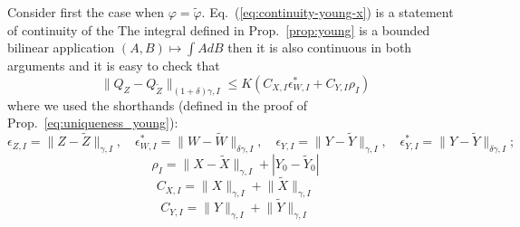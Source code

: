 \documentclass[a4paper,12pt,reqno]{amsproc}
\newcommand{\norm}[1]{\lVert #1\rVert}
\newcommand{\wt}{\widetilde}
\begin{document}
\proof
Consider first the case when $\varphi =\wt \varphi$.
Eq.~(\ref{eq:continuity-young-x}) is a statement of continuity of the
The integral defined in Prop.~\ref{prop:young} is  a bounded bilinear
application $(A,B) \mapsto \int A dB$ then it is also continuous in
both arguments and it is easy to check that  
\begin{equation}
\label{eq:continuity-young-x}
  \norm{Q_Z-Q_{\wt Z}}_{(1+\delta)\gamma,I} \le K(C_{X,I}
  \epsilon^*_{W,I} + C_{Y,I} \rho_I)
\end{equation}
where we used the shorthands (defined in the proof of Prop.~\ref{eq:uniqueness_young}):
$$
\epsilon_{Z,I} = \norm{Z-\wt Z}_{\gamma,I}, \quad
\epsilon_{W,I}^* = \norm{W-\wt W}_{\delta\gamma,I}, \quad
\epsilon_{Y,I} = \norm{Y-\wt Y}_{\gamma,I}, \quad
\epsilon_{Y,I}^* = \norm{Y-\wt Y}_{\delta\gamma,I};
$$
$$
\rho_I = \norm{X-\wt X}_{\gamma,I} + |Y_0 - \wt Y_0|
$$
$$
C_{X,I} = \norm{X}_{\gamma,I} + \norm{\wt X}_{\gamma,I}
$$
$$
C_{Y,I} = \norm{Y}_{\gamma,I} + \norm{\wt Y}_{\gamma,I}
$$
\end{document}
